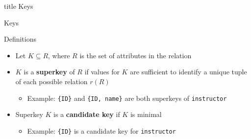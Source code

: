 \documentclass[aspectratio=169, xcolor=dvipsnames]{beamer}
\begin{document}
\begin{frame}
  \vfill
  \centering
  \begin{beamercolorbox}[sep=8pt,center,shadow=true,rounded=true]{title}
    Keys\par%
  \end{beamercolorbox}
  \vfill
\end{frame}

\begin{frame}{Keys}
    \begin{block}{Definitions}
        \begin{itemize}[<+->]
            \item Let $K \subseteq R$, where $R$ is the set of attributes in the relation
            \item $K$ is a \textbf{superkey} of $R$ if values for $K$ are sufficient to identify a unique tuple of each possible relation $r(R)$
            \begin{itemize}
                \item Example: \texttt{\{ID\}} and \texttt{\{ID, name\}} are both superkeys of \texttt{instructor}
            \end{itemize}
            \item Superkey $K$ is a \textbf{candidate key} if $K$ is minimal
            \begin{itemize}
                \item Example: \texttt{\{ID\}} is a candidate key for \texttt{instructor}
            \end{itemize}
        \end{itemize}
    \end{block}
    
\end{frame}
\end{document}

